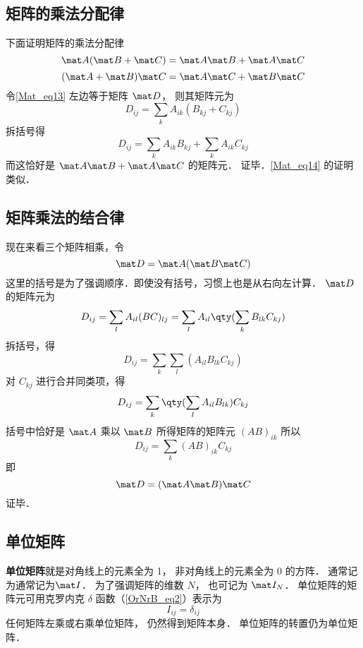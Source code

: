 \subsection{矩阵的乘法分配律}
下面证明矩阵的乘法分配律
\begin{equation}\label{Mat_eq13}
\mat A (\mat B + \mat C) = \mat A \mat B + \mat A \mat C
\end{equation}
\begin{equation}\label{Mat_eq14}
(\mat A + \mat B) \mat C = \mat A \mat C + \mat B \mat C
\end{equation}
令\autoref{Mat_eq13} 左边等于矩阵 $\mat D$， 则其矩阵元为
\begin{equation}
D_{ij} = \sum_k A_{ik} (B_{kj} + C_{kj})
\end{equation}
拆括号得
\begin{equation}
D_{ij} = \sum_k A_{ik}B_{kj} + \sum_k A_{ik}C_{kj}
\end{equation}
而这恰好是 $\mat A \mat B + \mat A \mat C$ 的矩阵元． 证毕．\autoref{Mat_eq14} 的证明类似．

\subsection{矩阵乘法的结合律}
现在来看三个矩阵相乘，令
\begin{equation}
\mat D = \mat A(\mat B\mat C)
\end{equation}
这里的括号是为了强调顺序．即使没有括号，习惯上也是从右向左计算． $\mat D$ 的矩阵元为
\begin{equation}
D_{ij} = \sum_l A_{il} (BC)_{lj} = \sum_l A_{il} \qty(\sum_k B_{lk}C_{kj} )
\end{equation}
拆括号，得
\begin{equation}
D_{ij} = \sum_k\sum_l  ( A_{il}B_{lk}C_{kj} )
\end{equation}
对 $C_{kj}$ 进行合并同类项，得
\begin{equation}
D_{ij} = \sum_k \qty(\sum_l A_{il}B_{lk} ) C_{kj} 
\end{equation}
括号中恰好是 $\mat A$ 乘以 $\mat B$ 所得矩阵的矩阵元 $(AB)_{ik}$ 所以
\begin{equation}
D_{ij} = \sum_k (AB)_{ik} C_{kj}
\end{equation}
即
\begin{equation}
\mat D = (\mat A\mat B)\mat C
\end{equation}
证毕．

\subsection{单位矩阵}
\textbf{单位矩阵}就是对角线上的元素全为 1， 非对角线上的元素全为 0 的方阵． 通常记为通常记为$\mat I$． 为了强调矩阵的维数 $N$， 也可记为 $\mat I_N$． 单位矩阵的矩阵元可用克罗内克 $\delta$ 函数（\autoref{OrNrB_eq2}）表示为
\begin{equation}
I_{ij} = \delta_{ij}
\end{equation} 
任何矩阵左乘或右乘单位矩阵， 仍然得到矩阵本身． 单位矩阵的转置仍为单位矩阵．

